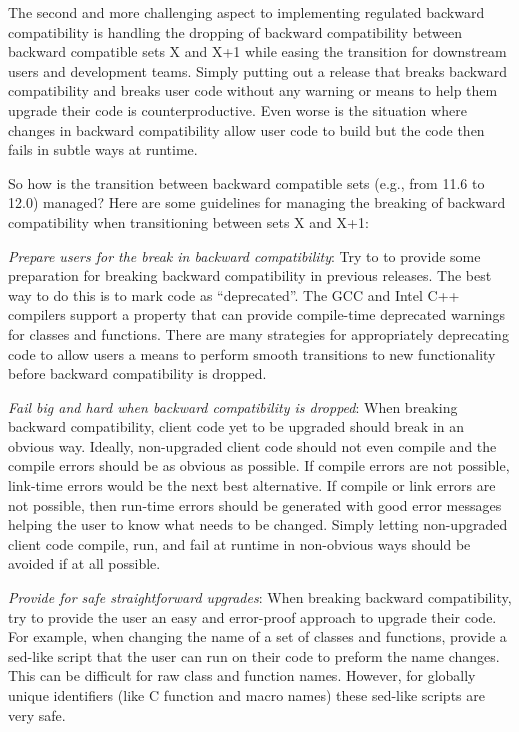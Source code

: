 \documentclass[11pt]{SANDreport}
\begin{document}
The second and more challenging aspect to implementing regulated backward compatibility is handling the dropping of backward compatibility between backward compatible sets X and X+1 while easing the transition for downstream users and development teams.  Simply putting out a release that breaks backward compatibility and breaks user code without any warning or means to help them upgrade their code is counterproductive.  Even worse is the situation where changes in backward compatibility allow user code to build but the code then fails in subtle ways at runtime.

So how is the transition between backward compatible sets (e.g., from 11.6 to 12.0) managed?  Here are some guidelines for managing the breaking of backward compatibility when transitioning between sets X and X+1:

\begin{compactitem}

{}\item\textit{Prepare users for the break in backward compatibility}: Try to to provide some preparation for breaking backward compatibility in previous releases.  The best way to do this is to mark code as ``deprecated''.  The GCC and Intel C++ compilers support a {} property that can provide compile-time deprecated warnings for classes and functions.  There are many strategies for appropriately deprecating code to allow users a means to perform smooth transitions to new functionality before backward compatibility is dropped.

{}\item\textit{Fail big and hard when backward compatibility is dropped}: When breaking backward compatibility, client code yet to be upgraded should break in an obvious way.  Ideally, non-upgraded client code should not even compile and the compile errors should be as obvious as possible.  If compile errors are not possible, link-time errors would be the next best alternative.  If compile or link errors are not possible, then run-time errors should be generated with good error messages helping the user to know what needs to be changed. Simply letting non-upgraded client code compile, run, and fail at runtime in non-obvious ways should be avoided if at all possible.

{}\item\textit{Provide for safe straightforward upgrades}: When breaking backward compatibility, try to provide the user an easy and error-proof approach to upgrade their code.  For example, when changing the name of a set of classes and functions, provide a sed-like script that the user can run on their code to preform the name changes.  This can be difficult for raw class and function names. However, for globally unique identifiers (like C function and macro names) these sed-like scripts are very safe.

\end{compactitem}
\end{document}
